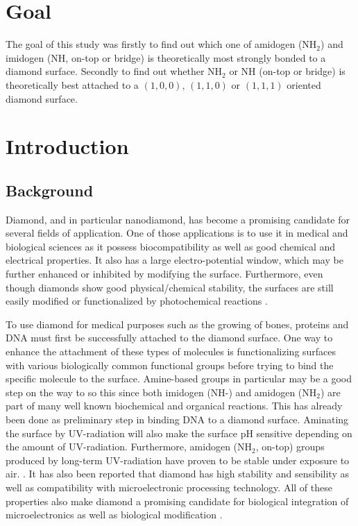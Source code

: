 \documentclass[10pt,a4paper]{article}
\begin{document}
\section{Goal}
The goal of this study was firstly to find out which one of amidogen (NH$_2$) and imidogen (NH, on-top or bridge) is theoretically most strongly bonded to a diamond surface. Secondly to find out whether NH$_2$ or NH (on-top or bridge) is theoretically best attached to a $(1,  0,  0)$, $(1,  1,  0)$ or $(1,  1, 1)$ oriented diamond surface.

\section{Introduction}
\subsection{Background}
Diamond, and in particular nanodiamond, has become a promising candidate for several fields of application. One of those applications is to use it in medical and biological sciences as it possess biocompatibility  as well as good chemical and electrical properties. It also has a large electro-potential window, which may be further enhanced or inhibited by modifying the surface. Furthermore, even though diamonds show good physical/chemical stability, the surfaces are still easily modified or functionalized by photochemical reactions \cite{c.e.nebel2007}.

To use diamond for medical purposes such as the growing of bones, proteins and DNA must first be successfully attached to the diamond surface. One way to enhance the attachment of these types of molecules is functionalizing surfaces with various biologically common functional groups before trying to bind the specific molecule to the surface. Amine-based groups in particular may be a good step on the way to so this since both imidogen (NH-) and amidogen (NH$_2$) are part of many well known biochemical and organical reactions. This has already been done as preliminary step in binding DNA to a diamond surface. Aminating the surface by UV-radiation will also make the surface pH sensitive depending on the amount of UV-radiation. Furthermore, amidogen (NH$_2$, on-top) groups produced by long-term UV-radiation have proven to be stable under exposure to air. \cite{kwang-soup.song2006}. It has also been reported that diamond has high stability and sensibility as well as compatibility with microelectronic processing technology. All of these properties also make diamond a promising candidate for  biological integration of microelectronics as well as biological modification \cite{yangwenshaw2002}. 
\end{document}
